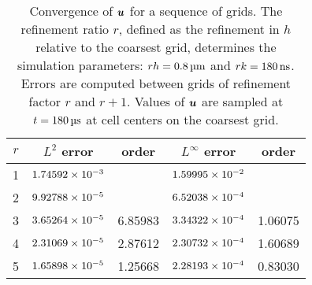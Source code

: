 \begin{table}[tb]
    \centering
    \caption[Convergence of fluid velocities for relaxing RBC test]{%
Convergence of $\boldsymbol{u}$ for a sequence of grids. The refinement ratio $r$, defined as the refinement in $h$ relative
to the coarsest grid, determines the simulation parameters: $rh = 0.8\um$ and $r\timestep = 180\ns$. Errors are
computed between grids of refinement factor $r$ and $r+1$. Values of $\boldsymbol{u}$ are sampled at $t = 180\us$ at cell
centers on the coarsest grid.
    }\label{tab:u-rbc-conv}
    \begingroup
    \setlength{\tabcolsep}{9pt}
    \renewcommand{\arraystretch}{1.5}
    \begin{tabular}{c|cc|cc}
                                                                                     \toprule
        $r$ & $L^2$ error            & order   & $L^\infty$ error       & order   \\ \midrule
        1   & ${1.74592}\times 10^{-3}$ &         & ${1.59995}\times 10^{-2}$ &         \\
        2   & ${9.92788}\times 10^{-5}$ &         & ${6.52038}\times 10^{-4}$ &         \\
        3   & ${3.65264}\times 10^{-5}$ & 6.85983 & ${3.34322}\times 10^{-4}$ & 1.06075 \\
        4   & ${2.31069}\times 10^{-5}$ & 2.87612 & ${2.30732}\times 10^{-4}$ & 1.60689 \\
        5   & ${1.65898}\times 10^{-5}$ & 1.25668 & ${2.28193}\times 10^{-4}$ & 0.83030 \\ \bottomrule
    \end{tabular}
    \endgroup
\end{table}

